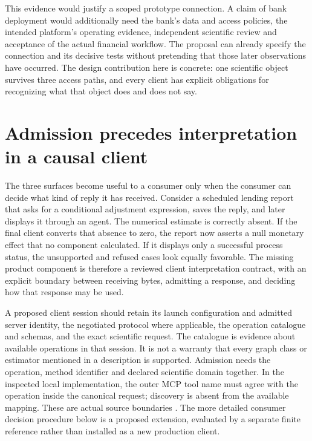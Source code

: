 This evidence would justify a scoped prototype connection. A claim of bank
deployment would additionally need the bank's data and access policies,
the intended platform's operating evidence, independent scientific review
and acceptance of the actual financial workflow. The proposal can already
specify the connection and its decisive tests without pretending that those
later observations have occurred. The design contribution here is concrete:
one scientific object survives three access paths, and every client has
explicit obligations for recognizing what that object does and does not say.
\label{exec13:i2-end}


\section{Admission precedes interpretation in a causal client}
\label{exec17:i2-admission}

The three surfaces become useful to a consumer only when the consumer can
decide what kind of reply it has received. Consider a scheduled lending
report that asks for a conditional adjustment expression, saves the reply,
and later displays it through an agent. The numerical estimate is correctly
absent. If the final client converts that absence to zero, the report now
asserts a null monetary effect that no component calculated. If it displays
only a successful process status, the unsupported and refused cases look
equally favorable. The missing product component is therefore a reviewed
client interpretation contract, with an explicit boundary between receiving
bytes, admitting a response, and deciding how that response may be used.

A proposed client session should retain its launch configuration and admitted
server identity, the negotiated protocol where applicable, the operation
catalogue and schemas, and the exact scientific request. The catalogue is
evidence about available operations in that session. It is not a warranty
that every graph class or estimator mentioned in a description is supported.
Admission needs the operation, method identifier and declared scientific
domain together. In the inspected local implementation, the outer MCP tool
name must agree with the operation inside the canonical request; discovery
is absent from the available mapping. These are actual source boundaries
\citep{exec13_i2_examples}. The more detailed consumer decision procedure
below is a proposed extension, evaluated by a separate finite reference
rather than installed as a new production client.

